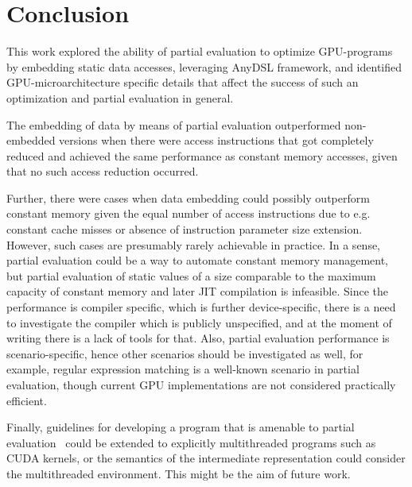 \section*{Conclusion}
This work explored the ability of partial evaluation to optimize GPU-programs 
by embedding static data accesses, leveraging AnyDSL framework, and identified 
GPU-microarchitecture specific details that affect the success of such an 
optimization and partial evaluation in general. 

The embedding of data by means of partial evaluation outperformed non-embedded versions when there were access instructions that got completely reduced and achieved the same performance as constant memory accesses, given that no such access reduction occurred.

Further, there were cases when data embedding could possibly outperform constant memory given the equal number of access instructions due to e.g. constant cache misses or absence of instruction parameter size extension. However, such cases are presumably rarely achievable in practice. In a sense, partial evaluation could be a way to automate constant memory management, but partial evaluation of static values of a size comparable to the maximum capacity of constant memory and later JIT compilation is infeasible. Since the performance is compiler specific, which is further device-specific, there is a need to investigate the compiler which is publicly unspecified, and at the moment of writing there is a lack of tools for that. Also, partial evaluation performance is scenario-specific, hence other scenarios should be investigated as well, for example, regular expression matching is a well-known scenario in partial evaluation, though current GPU implementations are not considered practically efficient.

Finally, guidelines for developing a program that is amenable to partial evaluation~\cite{Jones1993} could be extended to explicitly multithreaded programs such as CUDA kernels, or the semantics of the intermediate representation could consider the multithreaded environment. 
This might be the aim of future work.
